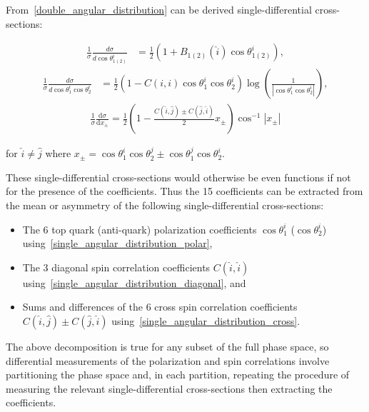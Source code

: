 From~\ref{double_angular_distribution} can be derived single-differential cross-sections:
\begin{linenomath*}
\begin{align}
\frac{1}{\sigma} \frac{d \sigma}{d \cos \theta_{1(2)}^i} & =\frac{1}{2}\left(1+B_{1(2)}(\hat{i}) \cos \theta_{1(2)}^i\right),
\label{single_angular_distribution_polar}
\end{align}
\begin{align}
\frac{1}{\sigma} \frac{d \sigma}{d \cos \theta_1^i \cos \theta_2^i} & =\frac{1}{2}\left(1-C(i, i) \cos \theta_1^i \cos \theta_2^i\right) \log \left(\frac{1}{\left \vert \cos \theta_1^i \cos \theta_2^i\right \vert}\right),
\label{single_angular_distribution_diagonal}
\end{align}
\begin{align}
\frac{1}{\sigma} \frac{\mathrm{d} \sigma}{\mathrm{d} x_{\pm}} = \frac{1}{2} \left(1-\frac{C(\hat{i},\hat{j}) \pm C(\hat{j},\hat{i})}{2} {x_{\pm}} \right) \cos ^{-1} \left \vert x_{\pm} \right \vert
\label{single_angular_distribution_cross}
\end{align}
\end{linenomath*}
\begin{center}
for $\hat{i} \neq \hat{j}$ where $x_{\pm} = \cos \theta_1^i \cos \theta_2^j \pm \cos \theta_1^j \cos \theta_2^i$.
\end{center}
These single-differential cross-sections would otherwise be even functions if not for the presence of the coefficients.
Thus the 15 coefficients can be extracted from the mean or asymmetry of the following single-differential cross-sections:
\begin{itemize}
\item The 6 top quark (anti-quark) polarization coefficients $\cos\theta_1^i$ ($\cos\theta_2^i$) using~\ref{single_angular_distribution_polar},
\item  The 3 diagonal spin correlation coefficients $C(\hat{i},\hat{i})$ using~\ref{single_angular_distribution_diagonal}, and
\item  Sums and differences of the 6 cross spin correlation coefficients $C(\hat{i},\hat{j}) \pm C(\hat{j},\hat{i})$ using~\ref{single_angular_distribution_cross}.
\end{itemize}

The above decomposition is true for any subset of the full phase space, so differential measurements of the polarization and spin correlations involve partitioning the phase space and, in each partition, repeating the procedure of measuring the relevant single-differential cross-sections then extracting the coefficients.

